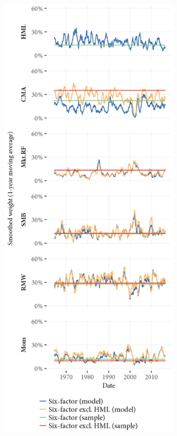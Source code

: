 \begin{figure}[htbp]
  \begin{subfigure}{0.45\textwidth}
    \includegraphics[width=\textwidth]{graphics/Weights_6F_EXCL_HML_6F.png}

\end{subfigure}
\end{figure}

